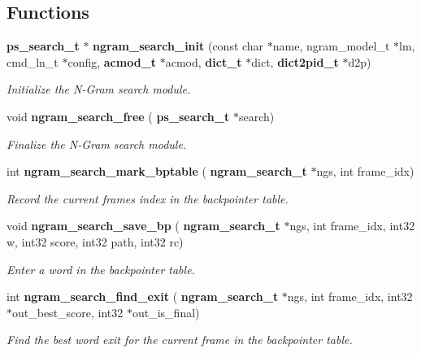 \subsection*{Functions}
\begin{DoxyCompactItemize}
\item 
\mbox{\label{ngram__search_8c_a04f80b377c847026254fb85596e2f43c}} 
\textbf{ ps\+\_\+search\+\_\+t} $\ast$ \textbf{ ngram\+\_\+search\+\_\+init} (const char $\ast$name, ngram\+\_\+model\+\_\+t $\ast$lm, cmd\+\_\+ln\+\_\+t $\ast$config, \textbf{ acmod\+\_\+t} $\ast$acmod, \textbf{ dict\+\_\+t} $\ast$dict, \textbf{ dict2pid\+\_\+t} $\ast$d2p)
\begin{DoxyCompactList}\small\item\em Initialize the N-\/\+Gram search module. \end{DoxyCompactList}\item 
\mbox{\label{ngram__search_8c_aeaf140dc2bbeaa5c274f73480b5328f3}} 
void \textbf{ ngram\+\_\+search\+\_\+free} (\textbf{ ps\+\_\+search\+\_\+t} $\ast$search)
\begin{DoxyCompactList}\small\item\em Finalize the N-\/\+Gram search module. \end{DoxyCompactList}\item 
int \textbf{ ngram\+\_\+search\+\_\+mark\+\_\+bptable} (\textbf{ ngram\+\_\+search\+\_\+t} $\ast$ngs, int frame\+\_\+idx)
\begin{DoxyCompactList}\small\item\em Record the current frame\textquotesingle{}s index in the backpointer table. \end{DoxyCompactList}\item 
\mbox{\label{ngram__search_8c_ae36649be6f5a2190e759e7ed13bd7b6b}} 
void \textbf{ ngram\+\_\+search\+\_\+save\+\_\+bp} (\textbf{ ngram\+\_\+search\+\_\+t} $\ast$ngs, int frame\+\_\+idx, int32 w, int32 score, int32 path, int32 rc)
\begin{DoxyCompactList}\small\item\em Enter a word in the backpointer table. \end{DoxyCompactList}\item 
int \textbf{ ngram\+\_\+search\+\_\+find\+\_\+exit} (\textbf{ ngram\+\_\+search\+\_\+t} $\ast$ngs, int frame\+\_\+idx, int32 $\ast$out\+\_\+best\+\_\+score, int32 $\ast$out\+\_\+is\+\_\+final)
\begin{DoxyCompactList}\small\item\em Find the best word exit for the current frame in the backpointer table. \end{DoxyCompactList}\item 

\end{DoxyCompactItemize}
